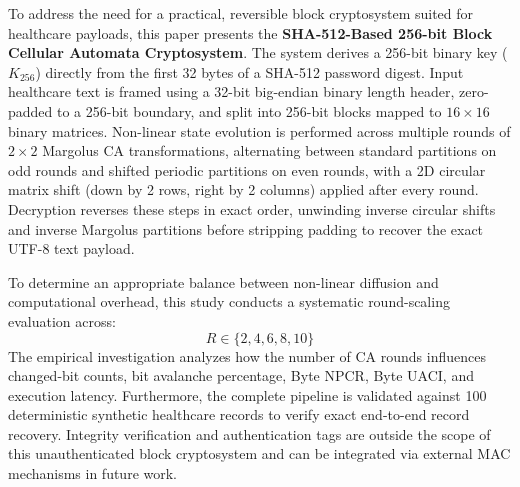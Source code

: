 To address the need for a practical, reversible block cryptosystem suited for healthcare payloads, this paper presents the \textbf{SHA-512-Based 256-bit Block Cellular Automata Cryptosystem}. The system derives a 256-bit binary key ($K_{256}$) directly from the first 32 bytes of a SHA-512 password digest. Input healthcare text is framed using a 32-bit big-endian binary length header, zero-padded to a 256-bit boundary, and split into 256-bit blocks mapped to $16 \times 16$ binary matrices. Non-linear state evolution is performed across multiple rounds of $2 \times 2$ Margolus CA transformations, alternating between standard partitions on odd rounds and shifted periodic partitions on even rounds, with a 2D circular matrix shift (down by 2 rows, right by 2 columns) applied after every round. Decryption reverses these steps in exact order, unwinding inverse circular shifts and inverse Margolus partitions before stripping padding to recover the exact UTF-8 text payload.

To determine an appropriate balance between non-linear diffusion and computational overhead, this study conducts a systematic round-scaling evaluation across:
\begin{equation}
R \in \{2, 4, 6, 8, 10\}
\end{equation}
The empirical investigation analyzes how the number of CA rounds influences changed-bit counts, bit avalanche percentage, Byte NPCR, Byte UACI, and execution latency. Furthermore, the complete pipeline is validated against 100 deterministic synthetic healthcare records to verify exact end-to-end record recovery. Integrity verification and authentication tags are outside the scope of this unauthenticated block cryptosystem and can be integrated via external MAC mechanisms in future work.

